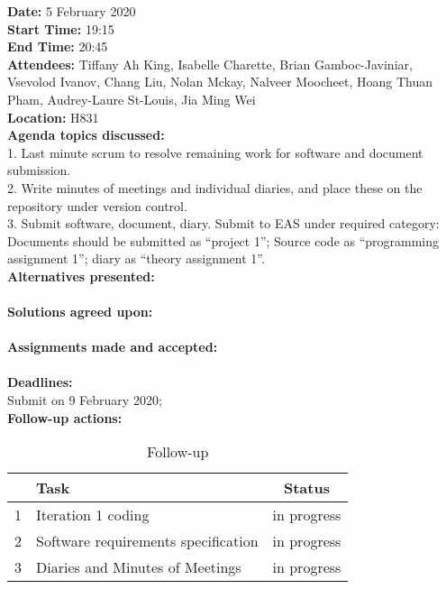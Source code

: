 \documentclass[12pt]{article}
\begin{document}
\newpage
{\bf Date:} 5 February 2020\\
{\bf Start Time:} 19:15\\
{\bf End Time:}  20:45\\
{\bf Attendees:} Tiffany Ah King,
Isabelle Charette,
Brian Gamboc-Javiniar,
Vsevolod Ivanov,
Chang Liu,
Nolan Mckay,
Nalveer Moocheet,
Hoang Thuan Pham,
Audrey-Laure St-Louis,
Jia Ming Wei\\
{\bf Location:} H831 \\
{\bf Agenda topics discussed:} \\1. Last minute scrum to resolve remaining work for software and document submission. 
\\2. Write minutes of meetings and individual diaries, and place these on the repository under version control. 
\\3. Submit software, document, diary. Submit to EAS under required category: Documents should be submitted as “project 1”; Source code as “programming assignment 1”; diary as “theory assignment 1”.\\
{\bf Alternatives presented:} \\ \\
{\bf Solutions agreed upon:} \\ \\
{\bf Assignments made and accepted:} \\ \\
{\bf Deadlines:} \\Submit on 9 February 2020; \\
{\bf Follow-up actions:} \\
\begin{table}[h!]
\centering
 \begin{tabular}{||l l c ||} 
 \hline
   & Task & Status\\ [0.5ex] 
 \hline\hline
 1 & Iteration 1 coding & in progress \\ 
 2 & Software requirements specification &  in progress\\
 3 & Diaries and Minutes of Meetings &  in progress\\[1ex] 

 \hline
 \end{tabular}
\caption{Follow-up }
\label{table:1}
\end{table}


\end{document}
